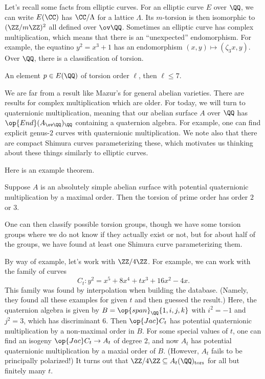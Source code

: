 \documentclass{article}
\begin{document}
Let's recall some facts from elliptic curves. For an elliptic curve $E$ over $\QQ$, we can write $E(\CC)$ has $\CC/\Lambda$ for a lattice $\Lambda$. Its $m$-torsion is then isomorphic to $(\ZZ/m\ZZ)^2$ all defined over $\ov\QQ$. Sometimes an elliptic curve has complex multiplication, which means that there is an ``unexpected'' endomorphism. For example, the equatino $y^2=x^3+1$ has an endomorphism $(x,y)\mapsto(\zeta_3x,y)$. Over $\QQ$, there is a classification of torsion.
\begin{theorem}[Mazur]
	An element $p\in E(\QQ)$ of torsion order $\ell$, then $\ell\le7$.
\end{theorem}
We are far from a result like Mazur's for general abelian varieties. There are results for complex multiplication which are older. For today, we will turn to quaternionic multiplication, meaning that our abelian surface $A$ over $\QQ$ has $\op{End}(A_{\ov\QQ})_\QQ$ containing a quaternion algebra. For example, one can find explicit genus-$2$ curves with quaternionic multiplication. We note also that there are compact Shimura curves parameterizing these, which motivates us thinking about these things similarly to elliptic curves.

Here is an example theorem.
\begin{theorem}
	Suppose $A$ is an absolutely simple abelian surface with potential quaternionic multiplication by a maximal order. Then the torsion of prime order has order $2$ or $3$.
\end{theorem}
One can then classify possible torsion groups, though we have some torsion groups where we do not know if they actually exist or not, but for about half of the groups, we have found at least one Shimura curve parameterizing them.

By way of example, let's work with $\ZZ/4\ZZ$. For example, we can work with the family of curves
\[C_t\colon y^2=x^5+8x^4+tx^3+16x^2-4x.\]
This family was found by interpolation when building the database. (Namely, they found all these examples for given $t$ and then guessed the result.) Here, the quaternion algebra is given by $B=\op{span}_\QQ\{1,i,j,k\}$ with $i^2=-1$ and $j^2=3$, which has discriminant $6$. Then $\op{Jac}C_t$ has potential quaternionic multiplication by a non-maximal order in $B$. For some special values of $t$, one can find an isogeny $\op{Jac}C_t\to A_t$ of degree $2$, and now $A_t$ has potential quaternionic multiplication by a maxial order of $B$. (However, $A_t$ fails to be principally polarized!) It turns out that $\ZZ/4\ZZ\subseteq A_t(\QQ)_{\mathrm{tors}}$ for all but finitely many $t$.
\end{document}
